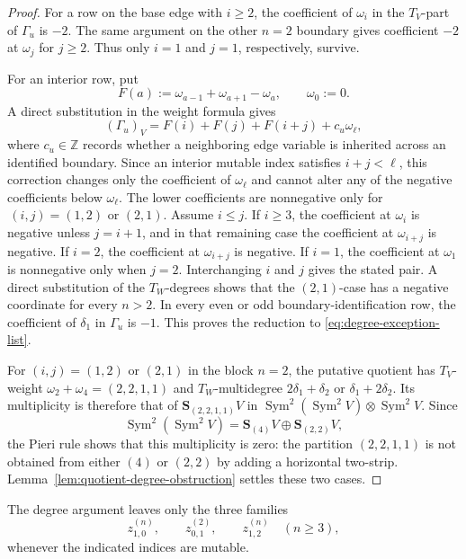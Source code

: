 \documentclass[11pt]{amsart}
\theoremstyle{definition}
\theoremstyle{remark}
\newcommand{\Sym}{\operatorname{Sym}}
\begin{document}
\begin{proof}
For a row on the base edge with $i\ge2$, the coefficient of $\omega_i$ in
the $T_V$-part of $\Gamma_u$ is $-2$.  The same argument on the other
$n=2$ boundary gives coefficient $-2$ at $\omega_j$ for
$j\ge2$.  Thus only $i=1$ and $j=1$, respectively, survive.

For an interior row, put
\[ F(a):=\omega_{a-1}+\omega_{a+1}-\omega_a, \qquad \omega_0:=0. \]
A direct substitution in the weight formula gives
\[ (\Gamma_u)_V=F(i)+F(j)+F(i+j)+c_u\omega_\ell, \]
where $c_u\in\mathbb Z$ records whether a neighboring edge variable is
inherited across an identified boundary.  Since an interior mutable index satisfies
$i+j<\ell$, this correction changes only the coefficient of
$\omega_\ell$ and cannot alter any of the negative coefficients below
${\omega_\ell}$.  The lower coefficients are nonnegative only for $\,(i,j)=(1,2)$ or $(2,1)$.  Assume $i\le j$.  If $i\ge3$, the coefficient at $\omega_i$ is negative
unless $j=i+1$, and in that remaining case the coefficient at
$\omega_{i+j}$ is negative.  If $i=2$, the coefficient at
$\omega_{i+j}$ is negative.  If $i=1$, the coefficient at
$\omega_1$ is nonnegative only when $j=2$.  Interchanging $i$ and
$j$ gives the stated pair.  A direct substitution of the
$T_W$-degrees shows that the $(2,1)$-case has a negative coordinate for
every $n>2$.  In every even or odd boundary-identification row, the coefficient of
$\delta_1$ in $\Gamma_u$ is $-1$.  This proves the reduction to
\eqref{eq:degree-exception-list}.

For $(i,j)=(1,2)$ or $(2,1)$ in the block $n=2$, the putative quotient has
$T_V$-weight
$\omega_2+\omega_4=(2,2,1,1)$
and $T_W$-multidegree $2\delta_1+\delta_2$ or
$\delta_1+2\delta_2$.  Its multiplicity is therefore that of
$\mathbf S_{(2,2,1,1)}V$ in
$\Sym^2(\Sym^2V)\otimes\Sym^2V.$
Since
\[ \Sym^2(\Sym^2V)=\mathbf S_{(4)}V\oplus\mathbf S_{(2,2)}V, \]
the Pieri rule \cite[Chapter~I]{Macdonald} shows that this multiplicity is zero: the partition
$(2,2,1,1)$ is not obtained from either $(4)$ or $(2,2)$ by adding a
horizontal two-strip.  Lemma~\ref{lem:quotient-degree-obstruction} settles
these two cases.
\end{proof}

The degree argument leaves only the three families
\begin{equation}
 z_{1,0}^{(n)},\qquad z_{0,1}^{(2)},\qquad z_{1,2}^{(n)}\quad(n\ge3),
 \label{eq:exceptional-coprimality-families}
\end{equation}
whenever the indicated indices are mutable.
\end{document}
